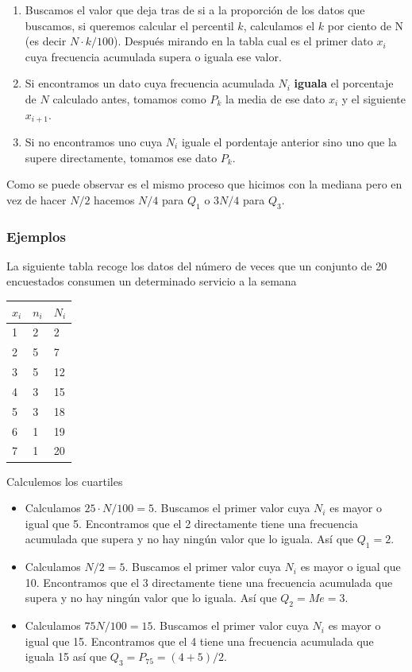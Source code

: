 \documentclass[
]{article}
\providecommand{\tightlist}{%
  \setlength{\itemsep}{0pt}\setlength{\parskip}{0pt}}
\begin{document}
\begin{enumerate}
\def\labelenumi{\arabic{enumi}.}
\tightlist
\item
  Buscamos el valor que deja tras de si a la proporción de los datos que
  buscamos, si queremos calcular el percentil \(k\), calculamos el \(k\)
  por ciento de N (es decir \(N\cdot k /100\)). Después mirando en la
  tabla cual es el primer dato \(x_i\) cuya frecuencia acumulada supera
  o iguala ese valor.
\item
  Si encontramos un dato cuya frecuencia acumulada \(N_i\)
  \textbf{iguala} el porcentaje de \(N\) calculado antes, tomamos como
  \(P_k\) la media de ese dato \(x_i\) y el siguiente \(x_{i+1}\).
\item
  Si no encontramos uno cuya \(N_i\) iguale el pordentaje anterior sino
  uno que la supere directamente, tomamos ese dato \(P_k\).
\end{enumerate}

Como se puede observar es el mismo proceso que hicimos con la mediana
pero en vez de hacer \(N/2\) hacemos \(N/4\) para \(Q_1\) o \(3N/4\)
para \(Q_3\).

\hypertarget{ejemplos-1}{%
\subsubsection{Ejemplos}\label{ejemplos-1}}

La siguiente tabla recoge los datos del número de veces que un conjunto
de 20 encuestados consumen un determinado servicio a la semana

\begin{longtable}[]{@{}lll@{}}
\toprule
\(x_i\) & \(n_i\) & \(N_i\)\tabularnewline
\midrule
\endhead
1 & 2 & 2\tabularnewline
2 & 5 & 7\tabularnewline
3 & 5 & 12\tabularnewline
4 & 3 & 15\tabularnewline
5 & 3 & 18\tabularnewline
6 & 1 & 19\tabularnewline
7 & 1 & 20\tabularnewline
\bottomrule
\end{longtable}

Calculemos los cuartiles

\begin{itemize}
\item
  Calculamos \(25 \cdot N / 100 = 5\). Buscamos el primer valor cuya
  \(N_i\) es mayor o igual que 5. Encontramos que el 2 directamente
  tiene una frecuencia acumulada que supera y no hay ningún valor que lo
  iguala. Así que \(Q_1 = 2\).
\item
  Calculamos \(N/2 = 5\). Buscamos el primer valor cuya \(N_i\) es mayor
  o igual que 10. Encontramos que el 3 directamente tiene una frecuencia
  acumulada que supera y no hay ningún valor que lo iguala. Así que
  \(Q_2 = Me = 3\).
\item
  Calculamos \(75 N/100 = 15\). Buscamos el primer valor cuya \(N_i\) es
  mayor o igual que 15. Encontramos que el 4 tiene una frecuencia
  acumulada que iguala 15 así que \(Q_3 = P_{75} = (4+5)/2\).
\end{itemize}
\end{document}
